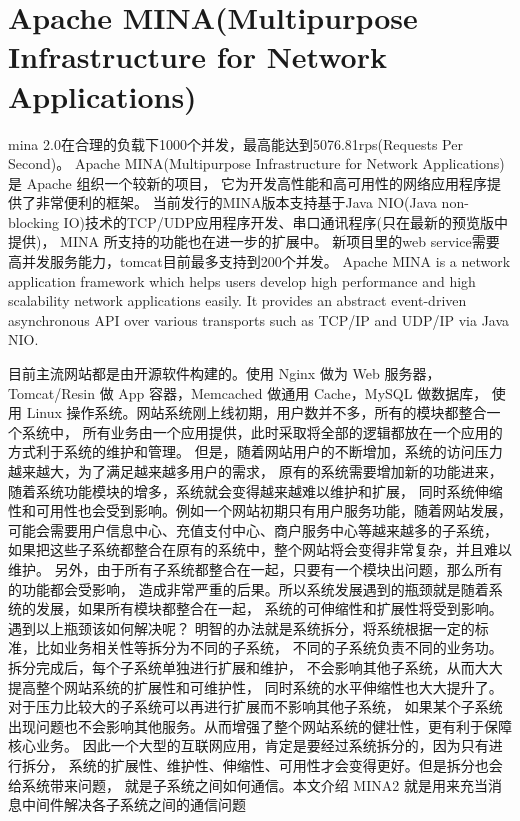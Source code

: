 \documentclass{book}
\begin{document}
\section{Apache MINA(Multipurpose Infrastructure for Network Applications)}

mina 2.0在合理的负载下1000个并发，最高能达到5076.81rps(Requests Per Second)。
Apache MINA(Multipurpose Infrastructure for Network Applications) 是 Apache 组织一个较新的项目，
它为开发高性能和高可用性的网络应用程序提供了非常便利的框架。
当前发行的MINA版本支持基于Java NIO(Java non-blocking IO)技术的TCP/UDP应用程序开发、串口通讯程序(只在最新的预览版中提供)，
MINA 所支持的功能也在进一步的扩展中。
新项目里的web service需要高并发服务能力，tomcat目前最多支持到200个并发。
Apache MINA is a network application framework 
which helps users develop high performance and high 
scalability network applications easily. 
It provides an abstract event-driven asynchronous 
API over various transports such as TCP/IP and UDP/IP via Java NIO.

目前主流网站都是由开源软件构建的。使用 Nginx 做为 Web 服务器，
Tomcat/Resin 做 App 容器，Memcached 做通用 Cache，MySQL 做数据库，
使用 Linux 操作系统。网站系统刚上线初期，用户数并不多，所有的模块都整合一个系统中，
所有业务由一个应用提供，此时采取将全部的逻辑都放在一个应用的方式利于系统的维护和管理。
但是，随着网站用户的不断增加，系统的访问压力越来越大，为了满足越来越多用户的需求，
原有的系统需要增加新的功能进来，随着系统功能模块的增多，系统就会变得越来越难以维护和扩展，
同时系统伸缩性和可用性也会受到影响。例如一个网站初期只有用户服务功能，随着网站发展，
可能会需要用户信息中心、充值支付中心、商户服务中心等越来越多的子系统，
如果把这些子系统都整合在原有的系统中，整个网站将会变得非常复杂，并且难以维护。
另外，由于所有子系统都整合在一起，只要有一个模块出问题，那么所有的功能都会受影响，
造成非常严重的后果。所以系统发展遇到的瓶颈就是随着系统的发展，如果所有模块都整合在一起，
系统的可伸缩性和扩展性将受到影响。遇到以上瓶颈该如何解决呢？
明智的办法就是系统拆分，将系统根据一定的标准，比如业务相关性等拆分为不同的子系统，
不同的子系统负责不同的业务功。拆分完成后，每个子系统单独进行扩展和维护，
不会影响其他子系统，从而大大提高整个网站系统的扩展性和可维护性，
同时系统的水平伸缩性也大大提升了。对于压力比较大的子系统可以再进行扩展而不影响其他子系统，
如果某个子系统出现问题也不会影响其他服务。从而增强了整个网站系统的健壮性，更有利于保障核心业务。
因此一个大型的互联网应用，肯定是要经过系统拆分的，因为只有进行拆分，
系统的扩展性、维护性、伸缩性、可用性才会变得更好。但是拆分也会给系统带来问题，
就是子系统之间如何通信。本文介绍 MINA2 就是用来充当消息中间件解决各子系统之间的通信问题
\end{document}
